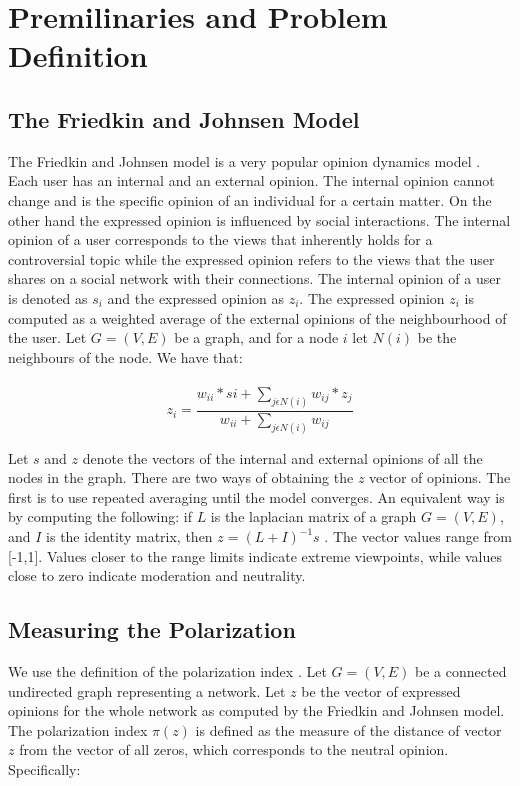 \chapter{Premilinaries and Problem Definition}
\label{ch:premAndDef}


\section{The Friedkin and Johnsen Model}
\label{sec:prem}

The Friedkin and Johnsen model is a very popular opinion dynamics model \cite{friedkin}. Each user has an internal and an external opinion. The internal opinion cannot change and is the specific opinion of an individual for a certain matter. On the other hand the expressed opinion is influenced by social interactions. The internal opinion of a user corresponds to the views that inherently holds for a controversial topic while the expressed opinion refers to the views that the user shares on a social network with their connections. The internal opinion of a user is denoted as $s_i$ and the expressed opinion as $z_i$. The expressed opinion $z_i$ is computed as a weighted average of the external opinions of the neighbourhood of the user. Let $G = (V,E)$ be a graph, and for a node $i$ let $N(i)$ be the neighbours of the node. We have that:
\\
\\
\begin{equation} 
	z_i = \frac{w_{ii}*si + \sum_{j \epsilon N(i) }{w_{ij}*z_j}} {w_{ii} + \sum_{j \epsilon N(i) }{w_{ij}}} 
\end{equation} 
\clearpage


\noindent Let $s$ and $z$ denote the vectors of the internal and external opinions of all the nodes in the graph. There are two ways of obtaining the $z$ vector of opinions. The first is to use repeated averaging until the model converges. An equivalent way is by computing the following: if $L$ is the laplacian matrix of a graph $G=(V,E)$, and $I$ is the identity matrix, then $z=(L+I)^{-1}s$ \cite{bindel}. The vector values range from [-1,1]. Values closer to the range limits indicate extreme viewpoints, while values close to zero indicate moderation and neutrality.

\section{Measuring the Polarization}
\label{sec:meas}
\vspace{30pt}
We use the definition of the polarization index \cite{tsapMatakosTerzi}. Let $G = (V,E)$ be a connected undirected graph representing a network. Let $z$ be the vector of expressed opinions  for the whole network as computed by the Friedkin and Johnsen model. The polarization index $\pi(z)$ is defined as the measure of the distance of vector $z$  from the vector of all zeros, which corresponds to the neutral opinion. Specifically:
\vspace{25pt}


